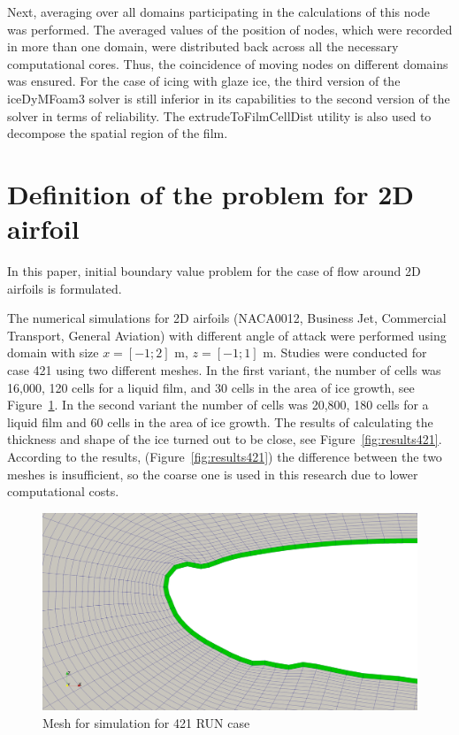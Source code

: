 \documentclass[aerospace,article,submit,moreauthors,pdftex]{Definitions/mdpi}
\begin{document}
Next, averaging over all domains participating in the calculations of this node was performed. The averaged values of the position of nodes, which were recorded in more than one domain, were distributed back across all the necessary computational cores. Thus, the coincidence of moving nodes on different domains was ensured. For the case of icing with glaze ice, the third version of the iceDyMFoam3 solver is still inferior in its capabilities to the second version of the solver in terms of reliability. The extrudeToFilmCellDist utility is also used to decompose the spatial region of the film.

\section{Definition of the problem for 2D airfoil \label{sec:Problemdefinition}}

In this paper, initial boundary value problem for the case of flow around 2D airfoils is formulated. 

The numerical simulations for 2D airfoils (NACA0012, Business Jet, Commercial Transport, General Aviation) with different angle of attack were performed using domain with size $x=[-1;2]$ m, $z=[-1;1]$ m. Studies were conducted for case 421 using two different meshes. In the first variant, the number of cells was 16,000, 120 cells for a liquid film, and 30 cells in the area of ice growth, see Figure~\ref{fig:Mesh}. In the second variant the number of cells was 20,800, 180 cells for a liquid film and 60 cells in the area of ice growth. The results of calculating the thickness and shape of the ice turned out to be close, see Figure~\ref{fig:results421}. According to the results, (Figure~\ref{fig:results421}) the difference between the two meshes is insufficient, so the coarse one is used in this research due to lower computational costs. 

\begin{figure}[H]
    \centering
    \includegraphics[scale=0.115]{Figures/mesh421L0004.png}
    \caption{Mesh for simulation for 421 RUN case}
    \label{fig:Mesh}
\end{figure}
\end{document}
